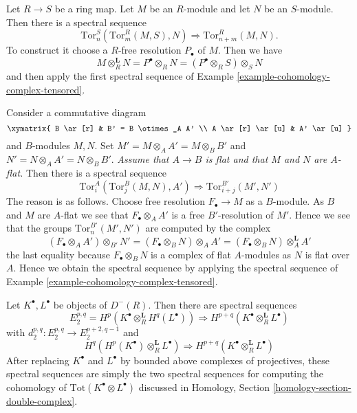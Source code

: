 \begin{example}
\label{example-tor-change-rings}
Let $R \to S$ be a ring map. Let $M$ be an $R$-module and let
$N$ be an $S$-module. Then there is a spectral sequence
$$
\text{Tor}^S_n(\text{Tor}^R_m(M, S), N) \Rightarrow
\text{Tor}^R_{n + m}(M, N).
$$
To construct it choose a $R$-free resolution $P_\bullet$ of $M$. Then we have
$$
M \otimes_R^{\mathbf{L}} N = P^\bullet \otimes_R N =
(P^\bullet \otimes_R S) \otimes_S N
$$
and then apply the first spectral sequence of
Example \ref{example-cohomology-complex-tensored}.
\end{example}

\begin{example}
\label{example-tor-base-change}
Consider a commutative diagram
$$
\xymatrix{
B \ar[r] & B' = B \otimes_A A' \\
A \ar[r] \ar[u] & A' \ar[u]
}
$$
and $B$-modules $M, N$. Set $M' = M \otimes_A A' = M \otimes_B B'$
and $N' = N \otimes_A A' = N \otimes_B B'$.
{\it Assume that $A \to B$ is flat and that $M$ and $N$ are $A$-flat.}
Then there is a spectral sequence
$$
\text{Tor}^A_i(\text{Tor}_j^B(M, N), A')
\Rightarrow
\text{Tor}^{B'}_{i + j}(M', N')
$$
The reason is as follows. Choose free resolution
$F_\bullet \to M$ as a $B$-module. As $B$ and $M$ are $A$-flat we see
that $F_\bullet \otimes_A A'$ is a free $B'$-resolution of $M'$.
Hence we see that the groups $\text{Tor}^{B'}_n(M', N')$ are
computed by the complex
$$
(F_\bullet \otimes_A A') \otimes_{B'} N' =
(F_\bullet \otimes_B N) \otimes_A A' =
(F_\bullet \otimes_B N) \otimes^{\mathbf{L}}_A A'
$$
the last equality because $F_\bullet \otimes_B N$ is a complex
of flat $A$-modules as $N$ is flat over $A$. Hence we obtain the
spectral sequence by applying the spectral sequence of
Example \ref{example-cohomology-complex-tensored}.
\end{example}

\begin{example}
\label{example-tor}
Let $K^\bullet, L^\bullet$ be objects of $D^{-}(R)$.
Then there are spectral sequences
$$
E_2^{p, q} = H^p(K^\bullet \otimes_R^{\mathbf{L}} H^q(L^\bullet))
\Rightarrow H^{p + q}(K^\bullet \otimes_R^{\mathbf{L}} L^\bullet)
$$
with $d_2^{p, q} : E_2^{p, q} \to E_2^{p + 2, q - 1}$
and
$$
H^q(H^p(K^\bullet) \otimes_R^{\mathbf{L}} L^\bullet)
\Rightarrow H^{p + q}(K^\bullet \otimes_R^{\mathbf{L}} L^\bullet)
$$
After replacing $K^\bullet$ and $L^\bullet$ by bounded above complexes
of projectives, these spectral sequences are simply the two spectral
sequences for computing the cohomology of
$\text{Tot}(K^\bullet \otimes L^\bullet)$ discussed in
Homology, Section \ref{homology-section-double-complex}.
\end{example}









